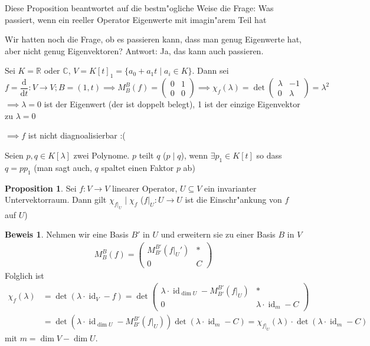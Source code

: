 \documentclass[fontsize=11pt,paper=a4,BCOR=0mm,DIV=11,automark,headsepline]{scrbook}
\newcommand{\gq}[1]{\glqq{}#1\grqq{}} %
\DeclareMathOperator{\mId}{id}
\theoremstyle{remark}
\theoremstyle{definition}
\newtheorem*{proposition}{Proposition}
\theoremstyle{proof}
\newtheorem*{prof}{Beweis}
\theoremstyle{remark}
\begin{document}
Diese Proposition beantwortet auf die bestm"ogliche Weise die Frage: \gq{Was
passiert, wenn ein reeller Operator Eigenwerte mit imagin"arem Teil hat}

\begin{exa}
  Wir hatten noch die Frage, ob es passieren kann, dass man \gq{genug} Eigenwerte hat, aber nicht genug Eigenvektoren? Antwort: Ja, das kann auch passieren.

  Sei \(K = \mathbb{R}\) oder \(\mathbb{C}\), \(V = K[t]_1 = \{a_0 + a_1 t\mid a_i\in K\}\). Dann sei
  \[f = \frac{\text{d}}{\text{d}t}: V\to V; B = (1, t) \implies M^B_B(f) =
    \begin{pmatrix}
      0 & 1 \\
      0 & 0
    \end{pmatrix}
   \implies \chi_f(\lambda) = \det
   \begin{pmatrix}
     \lambda & -1 \\
     0 & \lambda
   \end{pmatrix} = \lambda^2
\] \(\implies \lambda = 0\) ist der Eigenwert (der ist doppelt belegt), 1 ist der einzige Eigenvektor zu \(\lambda = 0\)

  \(\implies f\) ist nicht diagnoalisierbar :(
\end{exa}

\begin{definition}
  Seien $p,q\in K[\lambda]$ zwei Polynome. $p$ teilt $q$ ($p\mid q$), wenn \(\exists p_1 \in K[t]\) so dass \(q = pp_1\)
  (man sagt auch, \(q\) spaltet einen Faktor \(p\) ab)
\end{definition}

\begin{proposition}
  Sei \(f: V\to V\) linearer Operator, $U\subseteq V$ ein invarianter Untervektorraum. Dann gilt \(\chi_{f|_U} \mid \chi_f\) (\(f|_U:U\to U\) ist die Einschr"ankung von \(f\) auf \(U\))
\end{proposition}
\begin{prof}
  Nehmen wir eine Basis $B'$ in $U$ und erweitern sie zu einer Basis $B$ in $V$
  \begin{align*}
    M^B_B(f) =
    \begin{pmatrix}
      M^{B'}_{B'}(f|_U') & * \\
      0 & C
    \end{pmatrix}
  \end{align*}
  Folglich ist
  \begin{align*}
    \chi_f(\lambda) &= \det(\lambda\cdot\mId_V - f) = \det
    \begin{pmatrix}
      \lambda\cdot\mId_{\dim U} - M^{B'}_{B'}(f|_U) & *\\
      0 & \lambda\cdot\mId_m - C
    \end{pmatrix}\\
    &= \det(\lambda\cdot\mId_{\dim U} - M^{B'}_{B'}(f|_U))\det(\lambda\cdot\mId_m  - C) = \chi_{f|_U}(\lambda)\cdot\det(\lambda\cdot\mId_m - C)
  \end{align*}
  mit \(m = \dim V - \dim U\).
\end{prof}
\end{document}
